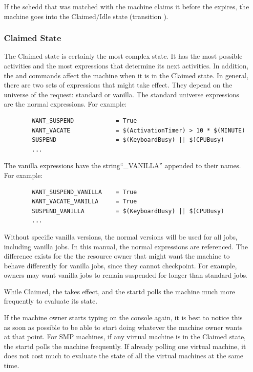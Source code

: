 If the schedd that was matched with the machine claims it before the
 expires, the machine goes into the Claimed/Idle
state (transition ).

\subsubsection{\label{sec:Claimed-State}Claimed State}

The Claimed state is certainly the most complex state.
It has the most possible activities and the most expressions that
determine its next activities.
In addition, the  and  commands affect
the machine when it is in the Claimed state.
In general, there are two sets of expressions that might take effect.
They depend on the universe of the request: standard or vanilla.
The standard universe expressions are the normal expressions.
For example:
\begin{verbatim}
        WANT_SUSPEND            = True
        WANT_VACATE             = $(ActivationTimer) > 10 * $(MINUTE)
        SUSPEND                 = $(KeyboardBusy) || $(CPUBusy)
        ...
\end{verbatim}

The vanilla expressions have the string``\_VANILLA'' appended to their names.
For example:
\begin{verbatim}
        WANT_SUSPEND_VANILLA    = True
        WANT_VACATE_VANILLA     = True
        SUSPEND_VANILLA         = $(KeyboardBusy) || $(CPUBusy)
        ...
\end{verbatim}

Without specific vanilla versions, the normal versions
will be used for all jobs, including vanilla jobs.  
In this manual, the normal expressions are referenced.
The difference exists for the
the resource owner that might want the machine
to behave differently for vanilla jobs, since they cannot checkpoint.
For example, owners may want vanilla jobs to remain suspended for
longer than standard jobs.

While Claimed, the  takes effect, and the
startd polls the machine much more frequently to evaluate its
state.

If the machine owner starts typing on the console again,
it is best to notice this as
soon as possible to be able to start doing whatever 
the machine owner wants at that point.
For SMP machines, if any virtual machine is in the Claimed state, the
startd polls the machine frequently.
If already polling one virtual machine, it does not
cost much to evaluate the state of all the virtual machines at
the same time.

